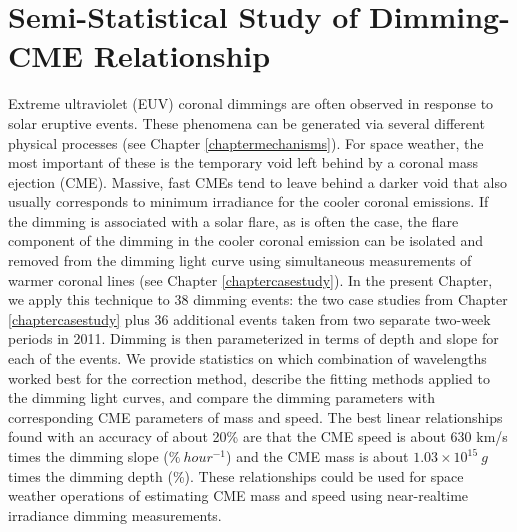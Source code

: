 \chapter{Semi-Statistical Study of Dimming-CME Relationship}
\label{chapterstatistical}

Extreme ultraviolet (EUV) coronal dimmings are often observed in response to solar eruptive events. These phenomena can be generated via several different physical processes (see Chapter \ref{chaptermechanisms}). For space weather, the most important of these is the temporary void left behind by a coronal mass ejection (CME). Massive, fast CMEs tend to leave behind a darker void that also usually corresponds to minimum irradiance for the cooler coronal emissions. If the dimming is associated with a solar flare, as is often the case, the flare component of the dimming in the cooler coronal emission can be isolated and removed from the dimming light curve using simultaneous measurements of warmer coronal lines (see Chapter \ref{chaptercasestudy}). In the present Chapter, we apply this technique to 38 dimming events: the two case studies from Chapter \ref{chaptercasestudy} plus 36 additional events taken from two separate two-week periods in 2011. Dimming is then parameterized in terms of depth and slope for each of the events. We provide statistics on which combination of wavelengths worked best for the correction method, describe the fitting methods applied to the dimming light curves, and compare the dimming parameters with corresponding CME parameters of mass and speed. The best linear relationships found with an accuracy of about 20\% are that the CME speed is about 630 km/s times the dimming slope ($\%\ hour^{-1}$) and the CME mass is about $1.03 \times 10^{15}\ g$ times the dimming depth (\%). These relationships could be used for space weather operations of estimating CME mass and speed using near-realtime irradiance dimming measurements.

